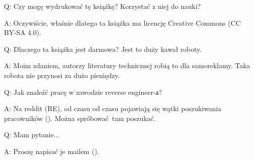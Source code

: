 \par Q: Czy mogę wydrukować tę książkę? Korzystać z niej do nauki?
\par A: Oczywiście, właśnie dlatego ta książka ma licencję Creative Commons (CC BY-SA 4.0).

\par Q: Dlaczego ta książka jest darmowa? Jest to duży kawał roboty.
\par A: Moim zdaniem, autorzy literatury technicznej robią to dla samoreklamy. Taka robota nie przynosi za dużo pieniędzy.

\par Q: Jak znaleźć pracę w zawodzie reverse engineer-а?
\par A: Na reddit (RE\FNURLREDDIT), od czasu od czasu pojawiają się wątki poszukiwania pracowników (\RedditHiringThread{}).
Można spróbować tam poszukać.


\par Q: Mam pytanie...
\par A: Proszę napisać je mailem (\EMAIL).

